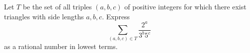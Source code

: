 Let $T$ be the set of all triples $(a,b,c)$ of positive integers for which there exist triangles with side lengths $a,b,c.$ Express \[\sum_{(a,b,c)\in T}\frac{2^a}{3^b5^c}\]as a rational number in lowest terms.